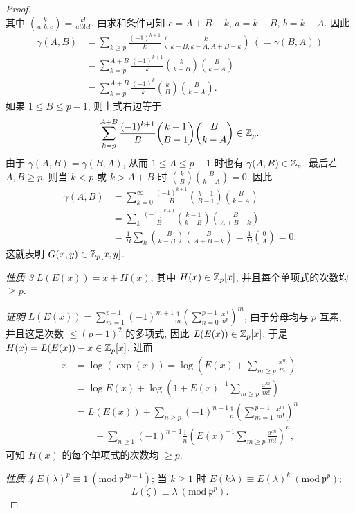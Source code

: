 \begin{proof}
\[\]
其中 $\binom{k}{a,b,c}=\frac{k!}{a!b!c!}$. 由求和条件可知 $c=A+B-k$, $a=k-B$, $b=k-A$. 因此
\begin{align*}
  \gamma(A,B)&=\sum_{k\geqslant p}\frac{(-1)^{k+1}}{k}\binom{k}{k-B,k-A,A+B-k}\ (=\gamma(B,A))\\
  &=\sum_{k=p}^{A+B}\frac{(-1)^{k+1}}{k}\binom{k}{k-B}\binom{B}{k-A}\\
  &=\sum_{k=p}^{A+B}\frac{(-1)^k}{k}\binom{k}{B}\binom{B}{k-A}.
\end{align*}
如果 $1\leqslant B\leqslant p-1$, 则上式右边等于
\[
  \sum_{k=p}^{A+B}\frac{(-1)^{k+1}}{B}\binom{k-1}{B-1}\binom{B}{k-A}\in\mathbb{Z}_p.
\]
由于 $\gamma(A,B)=\gamma(B,A)$, 从而 $1\leqslant A\leqslant p-1$ 时也有 $\gamma(A,B)\in\mathbb{Z}_p$. 最后若 $A,B\geqslant p$, 则当 $k<p$ 或 $k>A+B$ 时 $\binom{k}{B}\binom{B}{k-A}=0$. 因此
\begin{align*}
  \gamma(A,B)&=\sum_{k=0}^{\infty}\frac{(-1)^{k+1}}{B}\binom{k-1}{B-1}\binom{B}{k-A}\\
  &=\sum_k\frac{(-1)^{k+1}}{B}\binom{k-1}{k-B}\binom{B}{A+B-k}\\
  &=\frac{1}{B}\sum_k\binom{-B}{k-B}\binom{B}{A+B-k}
  =\frac{1}{B}\binom{0}{A}=0.
\end{align*}
这就表明 $G(x,y)\in\mathbb{Z}_p[x,y]$.

\emph{性质 3} $L(E(x))=x+H(x)$, 其中 $H(x)\in\mathbb{Z}_p[x]$, 并且每个单项式的次数均 $\geqslant p$.

\emph{证明} $L(E(x))=\sum_{m=1}^{p-1}(-1)^{m+1}\frac{1}{m}\left(\sum_{n=0}^{p-1}\frac{x^n}{n!}\right)^m$, 由于分母均与 $p$ 互素, 并且这是次数 $\leqslant(p-1)^2$ 的多项式, 因此 $L(E(x))\in\mathbb{Z}_p[x]$, 于是 $H(x)=L(E(x))-x\in\mathbb{Z}_p[x]$. 进而
\[
  \begin{aligned}
    x&=\log(\exp(x))=\log\left(E(x)+\sum_{m\geqslant p}\frac{x^m}{m!}\right)\\
    &=\log E(x)+\log\left(1+E(x)^{-1}\sum_{m\geqslant p}\frac{x^m}{m!}\right)\\
    &=L(E(x))+\sum_{n\geqslant p}(-1)^{n+1}\frac{1}{n}\left(\sum_{m=1}^{p-1}\frac{x^m}{m!}\right)^n\\
    &\qquad+\sum_{n\geqslant 1}(-1)^{n+1}\frac{1}{n}\left(E(x)^{-1}\sum_{m\geqslant p}\frac{x^m}{m!}\right)^n,
  \end{aligned}
\]
可知 $H(x)$ 的每个单项式的次数均 $\geqslant p$.

\emph{性质 4} $E(\lambda)^p\equiv 1\ (\mathrm{mod}\ \mathfrak{p}^{2p-1})$; 当 $k\geqslant 1$ 时 $E(k\lambda)\equiv E(\lambda)^k\ (\mathrm{mod}\ \mathfrak{p}^p)$;
\[
  L(\zeta)\equiv\lambda\ (\mathrm{mod}\ \mathfrak{p}^p).
\]


\end{proof}
